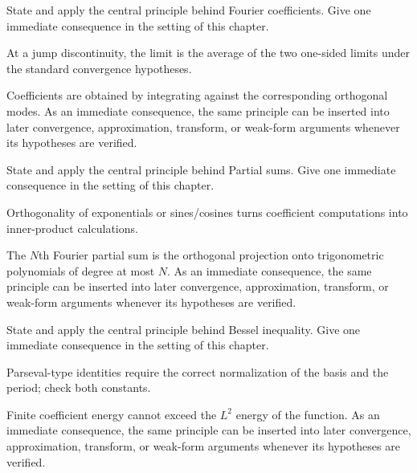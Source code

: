\begin{exercise}\label{exr:iii09-03}
State and apply the central principle behind Fourier coefficients. Give one immediate consequence in the setting of this chapter.
\end{exercise}
\begin{hint}
At a jump discontinuity, the limit is the average of the two one-sided limits under the standard convergence hypotheses.
\end{hint}
\begin{solution}
Coefficients are obtained by integrating against the corresponding orthogonal modes. As an immediate consequence, the same principle can be inserted into later convergence, approximation, transform, or weak-form arguments whenever its hypotheses are verified.
\end{solution}

\begin{exercise}\label{exr:iii09-04}
State and apply the central principle behind Partial sums. Give one immediate consequence in the setting of this chapter.
\end{exercise}
\begin{hint}
Orthogonality of exponentials or sines/cosines turns coefficient computations into inner-product calculations.
\end{hint}
\begin{solution}
The $N$th Fourier partial sum is the orthogonal projection onto trigonometric polynomials of degree at most $N$. As an immediate consequence, the same principle can be inserted into later convergence, approximation, transform, or weak-form arguments whenever its hypotheses are verified.
\end{solution}

\begin{exercise}\label{exr:iii09-05}
State and apply the central principle behind Bessel inequality. Give one immediate consequence in the setting of this chapter.
\end{exercise}
\begin{hint}
Parseval-type identities require the correct normalization of the basis and the period; check both constants.
\end{hint}
\begin{solution}
Finite coefficient energy cannot exceed the $L^2$ energy of the function. As an immediate consequence, the same principle can be inserted into later convergence, approximation, transform, or weak-form arguments whenever its hypotheses are verified.
\end{solution}


